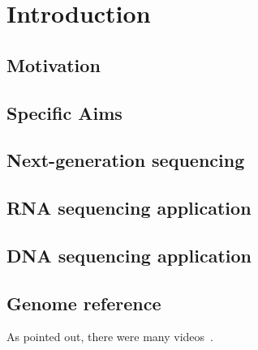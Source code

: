 \chapter{Introduction}
\label{c:intro}

\section{Motivation}
\label{s:motivation}

%
%

\section{Specific Aims}
\label{s:specific-aim}

%
%

\section{Next-generation sequencing}
\label{s:ngs}

%
\section{RNA sequencing application}
%
\section{DNA sequencing application}
%
\section{Genome reference}






As \cite{o2014cats} pointed out, there were many videos~\citep{o2014cats}.

